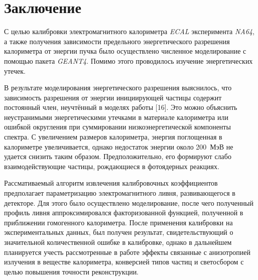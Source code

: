 \section*{Заключение}  \label{sec:concl} 

С целью калибровки электромагнитного калориметра \textit{ECAL} эксперимента \textit{NA64}, а также получения зависимости предельного энергетического разрешения калориметра от энергии пучка было осуществлено численное моделирование с помощью пакета \textit{GEANT4}. Помимо этого проводилось изучение энергетических утечек.

В результате моделирования энергетического разрешения выяснилось, что зависимость разрешения от энергии инициирующей частицы содержит постоянный член, неучтённый в моделях работы [16]. Это можно объяснить неустранимыми энергетическими утечками в материале калориметра или ошибкой округления при суммировании низкоэнергетической компоненты спектра. С увеличением размеров калориметра, энергия поглощенная в калориметре увеличивается, однако недостаток энергии около \mbox{200 МэВ} не удается снизить таким образом. Предположительно, его формируют слабо взаимодействующие частицы, рождающиеся в фотоядерных реакциях.

Рассмативаемый алгоритм извлечения калибровочных коэффициентов предполагает параметризацию электромагнитного ливня, развивающегося в детекторе. Для этого было осуществлено моделирование, после чего полученный профиль ливня аппроксимировался факторизованной функцией, полученной в приближении гомогенного калориметра. После применения калибровки на экспериментальных данных, был получен результат, свидетельствующий о значительной количественной ошибке в калибровке, однако в дальнейшем планируется учесть рассмотренные в работе эффекты связанные с анизотропией излучения в веществе калориметра, конверсией типов частиц и светосбором с целью повышения точности реконструкции.
